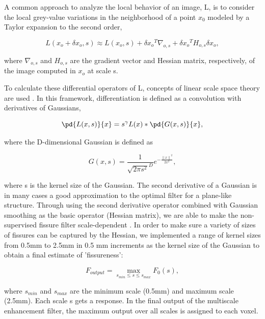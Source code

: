 {A common approach to analyze the local behavior of an image, L, is to consider the local grey-value variations in the neighborhood of a point $x_0$ modeled by a Taylor expansion to the second order,

\begin{equation}
 \label{eq:FissureDetection1}
 L(x_o + \delta x_o, s) \approx L(x_o, s) + \delta{x_o}^T\nabla_{o,s} + \delta{x_o}^TH_{o,s}\delta x_o,
\end{equation}

\noindent where $\nabla_{o,s}$ and $H_{o,s}$ are the gradient vector and Hessian matrix, respectively, of the image computed in $x_o$ at scale s.

To calculate these differential operators of L, concepts of linear scale space theory are used \citep{koenderink1984structure,florack1992scale}. In this framework, differentiation is defined as a convolution with derivatives of Gaussians,

\begin{equation}
 \label{eq:FissureDetection2}
 \pd{L(x,s)}{x} = s^\gamma L(x)*\pd{G(x,s)}{x},
\end{equation}

\noindent where the D-dimensional Gaussian is defined as

\begin{equation}
 \label{eq:FissureDetection3}
 G(x,s) = \frac{1}{{\sqrt{2\pi s^2}}^D}e^{-\frac{{\lVert x \rVert}^2}{2x^2}},
\end{equation}

\noindent where s is the kernel size of the Gaussian. The second derivative of a Gaussian is in many cases a good approximation to the optimal filter for a plane-like structure. Through using the second derivative operator combined with Gaussian smoothing as the basic operator (Hessian matrix), we are able to make the non-supervised fissure filter scale-dependent \citep{lorenz1997multi, li2003selective}. In order to make sure a variety of sizes of fissures can be captured by the Hessian, we implemented a range of kernel sizes from 0.5mm to 2.5mm in 0.5 mm increments as the kernel size of the Gaussian to obtain a final estimate of 'fissureness':

\begin{equation}
\label{eq:Multiscale}
F_{output} = \operatorname*{max}\limits_{s_{min}\leq s \leq s_{max}} F_0 (s),
\end{equation}

\noindent where $s_{min}$ and $s_{max}$ are the minimum scale (0.5mm) and maximum scale (2.5mm). Each scale s gets a response. In the final output of the multiscale enhancement filter, the maximum output over all scales is assigned to each voxel.

}
